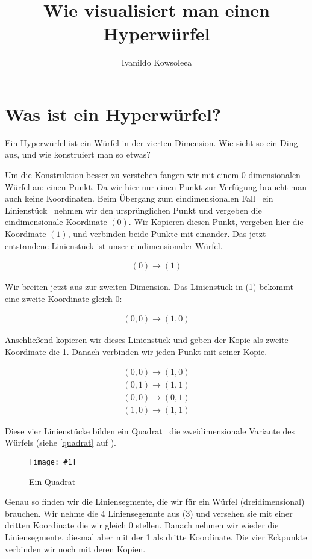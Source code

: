 \documentclass[10pt,a4paper,twoside,titlepage]{article}
\author{Ivanildo Kowsoleea}
\title{Wie visualisiert man einen Hyperwürfel}
\newcommand{\myeq}[2]{
	\begin{equation}
		\begin{split}
			#1
		\end{split}
		\label{#2}
	\end{equation}
}
\newcommand{\image}[4]{
	\begin{figure}[!ht]
		\centering
		\texttt{[image: \#1]}
		\caption{#2}
		\label{#3}
	\end{figure}
}
\begin{document}
\maketitle
\tableofcontents
\leading{13pt}

\section{Was ist ein Hyperwürfel?}
Ein Hyperwürfel ist ein Würfel in der vierten Dimension. Wie sieht so
ein Ding aus, und wie konstruiert man so etwas?

Um die Konstruktion besser zu verstehen fangen wir mit einem 0-dimen\-siona\-len
Würfel an: einen Punkt. Da wir hier nur einen Punkt zur Verfügung 
braucht man auch keine Koordinaten. Beim Übergang zum eindimensionalen Fall 
\textemdash\ ein Linienstück \textemdash\ nehmen wir den ursprünglichen Punkt
und vergeben die eindimensionale Koordinate $(0)$. Wir Kopieren diesen Punkt,
vergeben hier die Koordinate $(1)$, und verbinden beide Punkte mit einander.
Das jetzt entstandene Linienstück ist unser eindimensionaler Würfel.

\myeq{(0)\rightarrow (1)}{dim1}

Wir breiten jetzt aus zur zweiten Dimension. Das Linienstück in (1)
bekommt eine zweite Koordinate gleich 0:
\myeq{(0,0)\rightarrow (1,0)}{dim1in2}
Anschließend kopieren wir dieses Linienstück und geben der Kopie als zweite
Koordinate die 1. Danach verbinden wir jeden Punkt mit seiner Kopie.

\myeq{(0,0)\rightarrow (1,0)\\
	(0,1)\rightarrow(1,1)\\
	(0,0)\rightarrow(0,1)\\
	(1,0)\rightarrow(1,1)}{dim2}
	
Diese vier Linienstücke bilden ein Quadrat \textemdash\ die zweidimensionale
Variante des Würfels (siehe \autoref{quadrat} auf ).

\image{img/quadrat.eps}{Ein Quadrat}{quadrat}{5}

Genau so finden wir die Liniensegmente, die wir für ein Würfel (dreidimensional)
brauchen. Wir nehme die 4 Liniensegemnte aus (3) und versehen sie mit einer
dritten Koordinate die wir gleich 0 stellen. Danach nehmen wir wieder die 
Liniensegmente, diesmal aber mit der 1 als dritte Koordinate. Die 
vier Eckpunkte verbinden wir noch mit deren Kopien.
\end{document}
